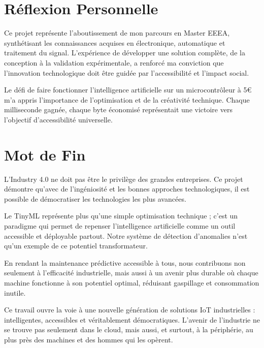 \section*{Réflexion Personnelle}

Ce projet représente l'aboutissement de mon parcours en Master EEEA, synthétisant les connaissances acquises en électronique, automatique et traitement du signal. L'expérience de développer une solution complète, de la conception à la validation expérimentale, a renforcé ma conviction que l'innovation technologique doit être guidée par l'accessibilité et l'impact social.

Le défi de faire fonctionner l'intelligence artificielle sur un microcontrôleur à 5€ m'a appris l'importance de l'optimisation et de la créativité technique. Chaque milliseconde gagnée, chaque byte économisé représentait une victoire vers l'objectif d'accessibilité universelle.

\section*{Mot de Fin}

L'Industry 4.0 ne doit pas être le privilège des grandes entreprises. Ce projet démontre qu'avec de l'ingéniosité et les bonnes approches technologiques, il est possible de démocratiser les technologies les plus avancées.

Le TinyML représente plus qu'une simple optimisation technique ; c'est un paradigme qui permet de repenser l'intelligence artificielle comme un outil accessible et déployable partout. Notre système de détection d'anomalies n'est qu'un exemple de ce potentiel transformateur.

En rendant la maintenance prédictive accessible à tous, nous contribuons non seulement à l'efficacité industrielle, mais aussi à un avenir plus durable où chaque machine fonctionne à son potentiel optimal, réduisant gaspillage et consommation inutile.

Ce travail ouvre la voie à une nouvelle génération de solutions IoT industrielles : intelligentes, accessibles et véritablement démocratiques. L'avenir de l'industrie ne se trouve pas seulement dans le cloud, mais aussi, et surtout, à la périphérie, au plus près des machines et des hommes qui les opèrent.